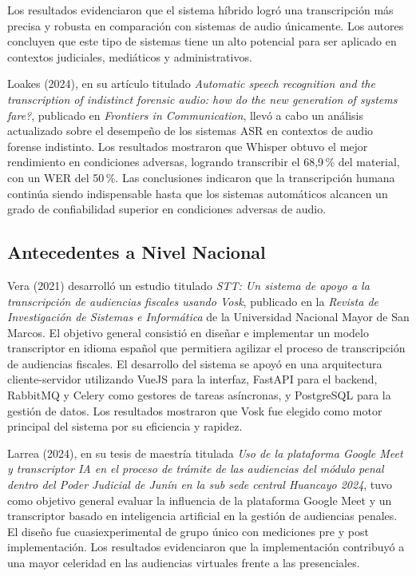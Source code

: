 \documentclass[12pt,a4paper,oneside]{report}
\begin{document}
Los resultados evidenciaron que el sistema híbrido logró una transcripción más precisa y robusta en comparación con sistemas de audio únicamente. Los autores concluyen que este tipo de sistemas tiene un alto potencial para ser aplicado en contextos judiciales, mediáticos y administrativos.

Loakes (2024), en su artículo titulado \textit{Automatic speech recognition and the transcription of indistinct forensic audio: how do the new generation of systems fare?}, publicado en \textit{Frontiers in Communication}, llevó a cabo un análisis actualizado sobre el desempeño de los sistemas ASR en contextos de audio forense indistinto. Los resultados mostraron que Whisper obtuvo el mejor rendimiento en condiciones adversas, logrando transcribir el 68,9\,\% del material, con un WER del 50\,\%. Las conclusiones indicaron que la transcripción humana continúa siendo indispensable hasta que los sistemas automáticos alcancen un grado de confiabilidad superior en condiciones adversas de audio.

\subsection{Antecedentes a Nivel Nacional}

Vera (2021) desarrolló un estudio titulado \textit{STT: Un sistema de apoyo a la transcripción de audiencias fiscales usando Vosk}, publicado en la \textit{Revista de Investigación de Sistemas e Informática} de la Universidad Nacional Mayor de San Marcos. El objetivo general consistió en diseñar e implementar un modelo transcriptor en idioma español que permitiera agilizar el proceso de transcripción de audiencias fiscales. El desarrollo del sistema se apoyó en una arquitectura cliente-servidor utilizando VueJS para la interfaz, FastAPI para el backend, RabbitMQ y Celery como gestores de tareas asíncronas, y PostgreSQL para la gestión de datos. Los resultados mostraron que Vosk fue elegido como motor principal del sistema por su eficiencia y rapidez.

Larrea (2024), en su tesis de maestría titulada \textit{Uso de la plataforma Google Meet y transcriptor IA en el proceso de trámite de las audiencias del módulo penal dentro del Poder Judicial de Junín en la sub sede central Huancayo 2024}, tuvo como objetivo general evaluar la influencia de la plataforma Google Meet y un transcriptor basado en inteligencia artificial en la gestión de audiencias penales. El diseño fue cuasiexperimental de grupo único con mediciones pre y post implementación. Los resultados evidenciaron que la implementación contribuyó a una mayor celeridad en las audiencias virtuales frente a las presenciales.
\end{document}
